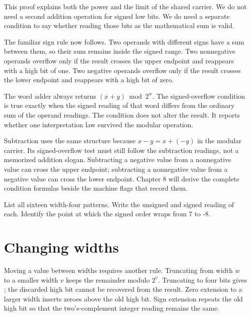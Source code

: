 This proof explains both the power and the limit of the shared carrier. We do
not need a second addition operation for signed low bits. We do need a
separate condition to say whether reading those bits as the mathematical sum
is valid.

The familiar sign rule now follows. Two operands with different signs have a
sum between them, so their sum remains inside the signed range. Two
nonnegative operands overflow only if the result crosses the upper endpoint
and reappears with a high bit of one. Two negative operands overflow only if
the result crosses the lower endpoint and reappears with a high bit of zero.

\begin{proofkit}[title={\iconProofKit\ A condition is a theorem about readings}]
The word adder always returns \((x+y)\bmod2^w\). The signed-overflow condition
is true exactly when the signed reading of that word differs from the ordinary
sum of the operand readings. The condition does not alter the result. It
reports whether one interpretation law survived the modular operation.
\end{proofkit}

Subtraction uses the same structure because
\(x-y=x+(-y)\) in the modular carrier. Its signed-overflow test must still
follow the subtraction readings, not a memorized addition slogan. Subtracting
a negative value from a nonnegative value can cross the upper endpoint;
subtracting a nonnegative value from a negative value can cross the lower
endpoint. Chapter 8 will derive the complete condition formulas beside the
machine flags that record them.

\begin{tryit}[title={Two readings, one pattern}]
List all sixteen width-four patterns. Write the unsigned and signed reading of
each. Identify the point at which the signed order wraps from 7 to -8.
\end{tryit}

\section{Changing widths}

Moving a value between widths requires another rule. Truncating from width
\(w\) to a smaller width \(v\) keeps the remainder modulo \(2^v\). Truncating
 to four bits gives ; the discarded high bit cannot
be recovered from the result. Zero
extension to a larger width inserts zeroes above the old high bit. Sign
extension repeats the old high bit so that the two's-complement integer
reading remains the same.

